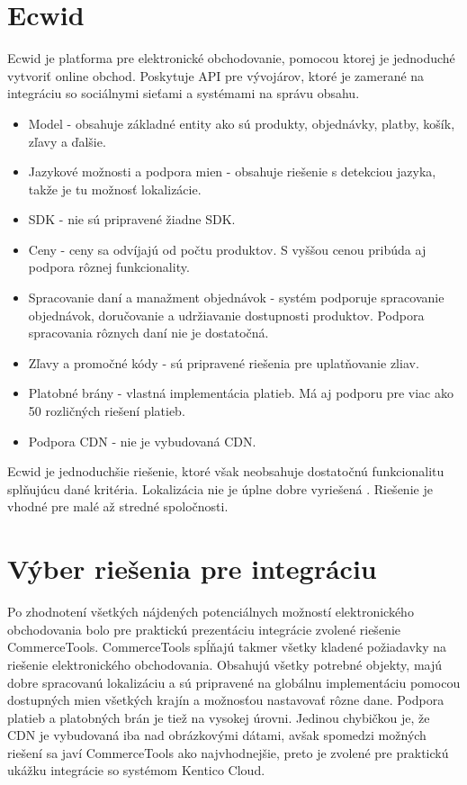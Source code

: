 \documentclass[
  printed, %
  table,   %
  lof,     %
  nolot,     %
  twoside,  
]{fithesis3}
\begin{document}
\section{Ecwid}
Ecwid je platforma pre elektronické obchodovanie, pomocou ktorej je jednoduché vytvoriť online obchod. Poskytuje API pre vývojárov, ktoré je zamerané na integráciu so sociálnymi sieťami a systémami na správu obsahu.
\begin{itemize}
	\item Model - obsahuje základné entity ako sú produkty, objednávky, platby, košík, zľavy a ďalšie. 
	\item Jazykové možnosti a podpora mien - obsahuje riešenie s detekciou jazyka, takže je tu možnosť lokalizácie.
	\item SDK - nie sú pripravené žiadne SDK.
	\item Ceny - ceny sa odvíjajú od počtu produktov. S vyššou cenou pribúda aj podpora rôznej funkcionality.
	\item Spracovanie daní a manažment objednávok - systém podporuje  spracovanie objednávok, doručovanie a udržiavanie dostupnosti produktov. Podpora spracovania rôznych daní nie je dostatočná.
	\item Zľavy a promočné kódy - sú pripravené riešenia pre uplatňovanie zliav.
	\item Platobné brány - vlastná implementácia platieb. Má aj podporu pre viac ako 50 rozličných riešení platieb.	
	\item Podpora CDN - nie je vybudovaná CDN.
		\end{itemize}
Ecwid je jednoduchšie riešenie, ktoré však neobsahuje dostatočnú funkcionalitu splňujúcu dané kritéria. Lokalizácia nie je úplne dobre vyriešená \cite{Ecwid}. Riešenie je vhodné pre malé až stredné spoločnosti.
\section{Výber riešenia pre integráciu}
Po zhodnotení všetkých nájdených potenciálnych možností elektronického obchodovania bolo pre praktickú prezentáciu integrácie zvolené riešenie CommerceTools. CommerceTools spĺňajú takmer všetky kladené požiadavky na riešenie elektronického obchodovania. Obsahujú všetky potrebné objekty, majú dobre spracovanú lokalizáciu a sú pripravené na globálnu implementáciu pomocou dostupných mien všetkých krajín a možnosťou nastavovať rôzne dane. Podpora platieb a platobných brán je tiež na vysokej úrovni. Jedinou chybičkou je, že CDN je vybudovaná iba nad obrázkovými dátami, avšak spomedzi možných riešení sa javí CommerceTools ako najvhodnejšie, preto je zvolené pre praktickú ukážku integrácie so systémom Kentico Cloud.
\end{document}
